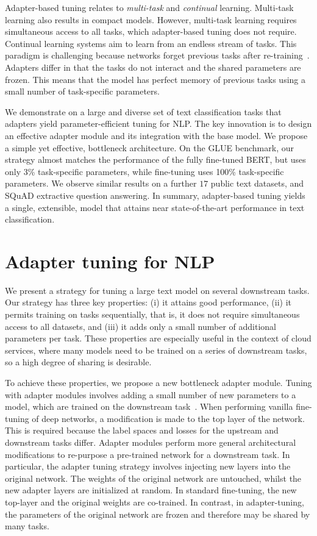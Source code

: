 Adapter-based tuning relates to \emph{multi-task} and \emph{continual} learning. Multi-task learning also results in compact models. However, multi-task learning requires simultaneous access to all tasks, which adapter-based tuning does not require. Continual learning systems aim to learn from an endless stream of tasks. This paradigm is challenging because networks forget previous tasks after re-training~\citep{mccloskey1989catastrophic,french1999catastrophic}. Adapters differ in that the tasks do not interact and the shared parameters are frozen. This means that the model has perfect memory of previous tasks using a small number of task-specific parameters.

We demonstrate on a large and diverse set of text classification tasks that adapters yield parameter-efficient tuning for NLP. The key innovation is to design an effective adapter module and its integration with the base model. We propose a simple yet effective, bottleneck architecture. On the GLUE benchmark, our strategy almost matches the performance of the fully fine-tuned BERT, but uses only 3\% task-specific parameters, while fine-tuning uses 100\% task-specific parameters. We observe similar results on a further $17$ public text datasets, and SQuAD extractive question answering. In summary, adapter-based tuning yields a single, extensible, model that attains near state-of-the-art performance in text classification.

\section{Adapter tuning for NLP}

We present a strategy for tuning a large text model on several downstream tasks. Our strategy has three key properties: (i) it attains good performance, (ii) it permits training on tasks sequentially, that is, it does not require simultaneous access to all datasets, and (iii) it adds only a small number of additional parameters per task. These properties are especially useful in the context of cloud services, where many models need to be trained on a series of downstream tasks, so a high degree of sharing is desirable.

To achieve these properties, we propose a new bottleneck adapter module. Tuning with adapter modules involves adding a small number of new parameters to a model, which are trained on the downstream task~\citep{rebuffi2017}. When performing vanilla fine-tuning of deep networks, a modification is made to the top layer of the network. This is required because the label spaces and losses for the upstream and downstream tasks differ. Adapter modules perform more general architectural modifications to re-purpose a pre-trained network for a downstream task. In particular, the adapter tuning strategy involves injecting new layers into the original network. The weights of the original network are untouched, whilst the new adapter layers are initialized at random. In standard fine-tuning, the new top-layer and the original weights are co-trained. In contrast, in adapter-tuning, the parameters of the original network are frozen and therefore may be shared by many tasks.

